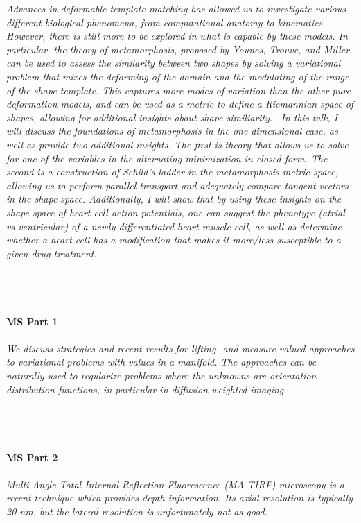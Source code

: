 \begin{multicols}{2}
    \textit{Advances in deformable template matching has allowed us to investigate various different biological phenomena, from computational anatomy to kinematics.  However, there is still more to be explored in what is capable by these models.  In particular, the theory of metamorphosis, proposed by Younes, Trouve, and Miller, can be used to assess the similarity between two shapes by solving a variational problem that mixes the deforming of the domain and the modulating of the range of the shape template. This captures more modes of variation than the other pure deformation models, and can be used as a metric to define a Riemannian space of shapes, allowing for additional insights about shape similiarity.
\
In this talk, I will discuss the foundations of metamorphosis in the one dimensional case, as well as provide two additional insights.  The first is theory that allows us to solve for one of the variables in the alternating minimization in closed form.  The second is a construction of Schild's ladder in the metamorphosis metric space, allowing us to perform parallel transport and adequately compare tangent vectors in the shape space.  Additionally, I will show that by using these insights on the shape space of heart cell action potentials, one can suggest the phenotype (atrial vs ventricular) of a newly differentiated heart muscle cell, as
well as determine whether a heart cell has a modification that makes it more/less susceptible to a given drug treatment.}\\
\\ 
    \\
    \\\\
    \noindent\textbf{MS Part 1}\\
\\  
    \textit{We discuss strategies and recent results for lifting- and measure-valued approaches to variational problems with values in a manifold. The approaches can be naturally used to regularize problems where the unknowns are orientation distribution functions, in particular in diffusion-weighted imaging.}\\
\\ 
    \\
    \\\\
    \noindent\textbf{MS Part 2}\\
\\  
    \textit{Multi-Angle Total Internal Reflection Fluorescence (MA-TIRF) microscopy is a recent technique which provides depth information. Its axial resolution is typically 20 nm, but the lateral resolution is unfortunately not as good.
}
\end{multicols}
